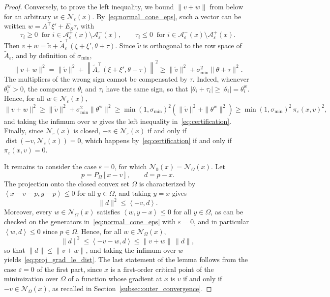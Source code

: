 \documentclass{article}
\numberwithin{equation}{section}
\newcommand{\calA}{{\mathcal{A}}}
\newcommand{\calN}{{\mathcal{N}}}
\newcommand{\inner}[2]{\left\langle {#1} , {#2} \right\rangle} %
\newcommand{\proj}[2]{P_{#1} \left[ {#2} \right]} %
\theoremstyle{plain}
\begin{document}
\begin{proof}
	Conversely, to prove the left inequality, we bound $\|v+w\|$ from below for an arbitrary $w \in \calN_\varepsilon(x)$. By~\eqref{eq:normal_cone_eps}, such a vector can be written $w = A^\top\xi' + E_S\tau$, with
	\[\tau_i \ge 0 \ \text{ for } i \in \calA^+_\varepsilon(x)\setminus\calA^-_\varepsilon(x), \qquad \tau_i \le 0 \ \text{ for } i \in \calA^-_\varepsilon(x)\setminus\calA^+_\varepsilon(x).\]
	Then $v + w = \tilde{v} + \tilde{A}_\varepsilon^\top(\xi+\xi',\theta+\tau)$. Since $\tilde{v}$ is orthogonal to the row space of $\tilde{A}_\varepsilon$, and by definition of $\sigma_{\min}$,
	\[\|v+w\|^2 = \|\tilde{v}\|^2 + \left\|\tilde{A}_\varepsilon^\top(\xi+\xi',\theta+\tau)\right\|^2 \ge \|\tilde{v}\|^2 + \sigma_{\min}^2\|\theta+\tau\|^2.\]
	The multipliers of the wrong sign cannot be compensated by $\tau$. Indeed, whenever $\theta^{\mathrm{w}}_i > 0$, the components $\theta_i$ and $\tau_i$ have the same sign, so that $|\theta_i + \tau_i| \ge |\theta_i| = \theta^{\mathrm{w}}_i$. Hence, for all $w \in \calN_\varepsilon(x)$,
	\[\|v+w\|^2 \ge \|\tilde{v}\|^2 + \sigma_{\min}^2\|\theta^{\mathrm{w}}\|^2 \ge \min(1,\sigma_{\min})^2\left(\|\tilde{v}\|^2 + \|\theta^{\mathrm{w}}\|^2\right) \ge \min(1,\sigma_{\min})^2\,\pi_\varepsilon(x,v)^2,\]
	and taking the infimum over $w$ gives the left inequality in~\eqref{eq:certification}. Finally, since $\calN_\varepsilon(x)$ is closed, $-v \in \calN_\varepsilon(x)$ if and only if $\operatorname{dist}(-v,\calN_\varepsilon(x)) = 0$, which happens by~\eqref{eq:certification} if and only if $\pi_\varepsilon(x,v) = 0$.

	It remains to consider the case $\varepsilon = 0$, for which $\calN_0(x) = \calN_\Omega(x)$. Let
	\[p = \proj{\Omega}{x-v}, \qquad d = p - x.\]
	The projection onto the closed convex set $\Omega$ is characterized by $\inner{x-v-p}{y-p} \le 0$ for all $y \in \Omega$, and taking $y = x$ gives
	\[\|d\|^2 \le \inner{-v}{d}.\]
	Moreover, every $w \in \calN_\Omega(x)$ satisfies $\inner{w}{y-x} \le 0$ for all $y \in \Omega$, as can be checked on the generators in~\eqref{eq:normal_cone_eps} with $\varepsilon = 0$, and in particular $\inner{w}{d} \le 0$ since $p \in \Omega$. Hence, for all $w \in \calN_\Omega(x)$,
	\[\|d\|^2 \le \inner{-v-w}{d} \le \|v+w\|\,\|d\|,\]
	so that $\|d\| \le \|v+w\|$, and taking the infimum over $w$ yields~\eqref{eq:proj_grad_le_dist}. The last statement of the lemma follows from the case $\varepsilon = 0$ of the first part, since $x$ is a first-order critical point of the minimization over $\Omega$ of a function whose gradient at $x$ is $v$ if and only if $-v \in \calN_\Omega(x)$, as recalled in Section~\ref{subsec:outer_convergence}.
\end{proof}
\end{document}
